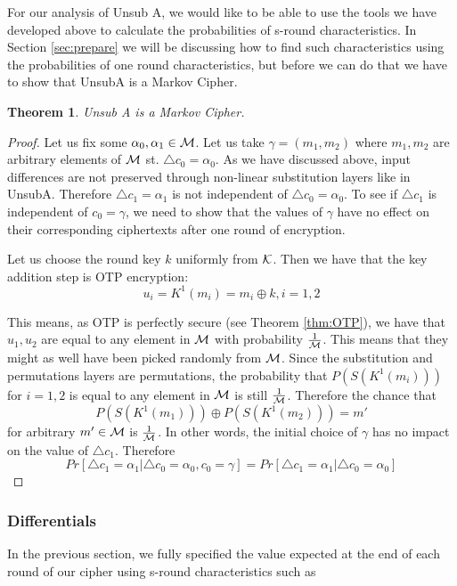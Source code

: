 \documentclass[12pt,a4paper]{article}
\newtheorem{theorem}{Theorem}
\begin{document}
For our analysis of Unsub A, we would like to be able to use the tools we have
developed above to calculate the probabilities of s-round characteristics. In
Section \ref{sec:prepare} we will be discussing how to find such characteristics
using the probabilities of one round characteristics,
but before we can do that we have to show that UnsubA is a Markov Cipher.

\begin{theorem}
Unsub A is a Markov Cipher.
\end{theorem}
\begin{proof}

Let us fix some $\alpha_0,\alpha_1 \in \cal{M}$. Let us take $\gamma = (m_1,m_2)$ where $m_1,m_2$ are arbitrary elements of
$\cal{M}$ st. $\triangle c_0 = \alpha_0$. As we have discussed above, input
differences are not preserved through non-linear substitution layers like in
UnsubA. Therefore $\triangle c_1 = \alpha_1$ is not independent of
$\triangle c_0 = \alpha_0$. To see if $\triangle c_1$ is independent of $c_0 =
\gamma$, we need to show that the values of $\gamma$ have no effect on their
corresponding ciphertexts after one round of encryption.

Let us choose the round key $k$
uniformly from $\cal{K}$. Then we have that the key addition step is OTP
encryption:
\[u_i = K^1(m_i) = m_i \oplus k, i=1,2\]

This means, as OTP is perfectly secure (see Theorem \ref{thm:OTP}), we have
that $u_1,u_2$ are equal to any element in $\cal{M}$ with probability
$\frac{1}{\cal{M}}$. This means that they might as well have been picked
randomly from $\cal{M}$. Since the substitution and permutations layers are
permutations, the probability that $P(S(K^1(m_i)))$ for $i=1,2$ is equal to any
element in $\cal{M}$ is still $\frac{1}{\cal{M}}$. Therefore the chance that 
\[P(S(K^1(m_1))) \oplus P(S(K^1(m_2))) = m'\] 
for arbitrary $m' \in \cal{M}$ is $\frac{1}{\cal{M}}$. In other words, the initial choice
of $\gamma$ has no impact on the value of $\triangle c_1$. Therefore
\[Pr[\triangle c_1 = \alpha_1 | \triangle c_0 = \alpha_0, c_0 = \gamma] =
Pr[\triangle c_1 = \alpha_1 | \triangle c_0 = \alpha_0]\]
\end{proof}
\subsubsection{Differentials}
\label{sec:differentials}
In the previous section, we fully specified the value expected at the end of
each round of our cipher using s-round characteristics such as
\end{document}
